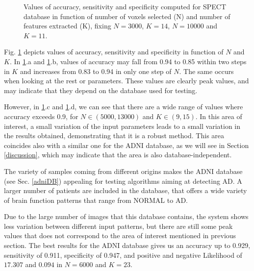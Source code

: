 \begin{figure}
		\caption{Values of accuracy, sensitivity and specificity computed for SPECT database in function of number of voxels selected (N) and number of features extracted (K), fixing \protect{} $N=3000$, \protect{} $K=14$, \protect{} $N=10000$ and \protect{} $K=11$.}
		\label{fig:spectResults}
	\end{figure}
	
	Fig. \ref{fig:spectResults} depicts values of accuracy, sensitivity and specificity in function of $N$ and $K$. In \ref{fig:spectResults}.a and \ref{fig:spectResults}.b, values of accuracy may fall from 0.94 to 0.85 within two steps in $K$ and increases from 0.83 to 0.94 in only one step of $N$. The same occurs when looking at the rest or parameters. These values are clearly peak values, and may indicate that they depend on the database used for testing.
	
	However, in \ref{fig:spectResults}.c and \ref{fig:spectResults}.d, we can see that there are a wide range of values where accuracy exceeds 0.9, for $N \in (5000, 13000)$ and $K \in (9, 15)$. In this area of interest, a small variation of the input parameters leads to a small variation in the results obtained, demonstrating that it is a robust method. This area coincides also with a similar one for the ADNI database, as we will see in Section \ref{discussion}, which may indicate that the area is also database-independent.
	
	The variety of samples coming from different origins makes the ADNI database (see Sec. \ref{adniDB}) appealing for testing algorithms aiming at detecting AD. A larger number of patients are included in the database, that offers a wide variety of brain function patterns that range from NORMAL to AD.
	
	Due to the large number of images that this database contains, the system shows less variation between different input patterns, but there are still some peak values that does not correspond to the area of interest mentioned in previous section. The best results for the ADNI database gives us an accuracy up to 0.929, sensitivity of 0.911, specificity of 0.947, and positive and negative Likelihood of $17.307$ and $0.094$ in $N=6000$ and $K=23$.
	

